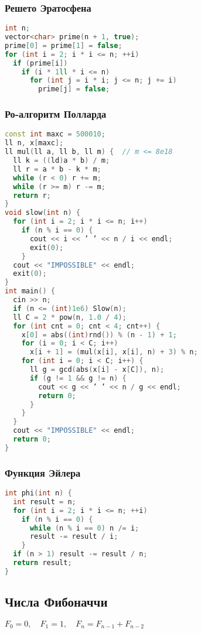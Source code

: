 \documentclass[10pt,a4paper,landscape,twosided]{extarticle}
\begin{document}
\begin{multicols}{3}
\subsubsection{Решето Эратосфена}
\begin{lstlisting}[language=C++]
int n;
vector<char> prime(n + 1, true);
prime[0] = prime[1] = false;
for (int i = 2; i * i <= n; ++i)
  if (prime[i])
    if (i * 1ll * i <= n)
      for (int j = i * i; j <= n; j += i)
        prime[j] = false;
\end{lstlisting}

\subsubsection{Ро-алгоритм Полларда}
\begin{lstlisting}[language=C++]
const int maxc = 500010;
ll n, x[maxc];
ll mul(ll a, ll b, ll m) {  // m <= 8e18
  ll k = ((ld)a * b) / m;
  ll r = a * b - k * m;
  while (r < 0) r += m;
  while (r >= m) r -= m;
  return r;
}
void slow(int n) {
  for (int i = 2; i * i <= n; i++)
    if (n % i == 0) {
      cout << i << ’ ’ << n / i << endl;
      exit(0);
    }
  cout << "IMPOSSIBLE" << endl;
  exit(0);
}
int main() {
  cin >> n;
  if (n <= (int)1e6) Slow(n);
  ll C = 2 * pow(n, 1.0 / 4);
  for (int cnt = 0; cnt < 4; cnt++) {
    x[0] = abs((int)rnd()) % (n - 1) + 1;
    for (i = 0; i < C; i++)
      x[i + 1] = (mul(x[i], x[i], n) + 3) % n;
    for (int i = 0; i < C; i++) {
      ll g = gcd(abs(x[i] - x[C]), n);
      if (g != 1 && g != n) {
        cout << g << ’ ’ << n / g << endl;
        return 0;
      }
    }
  }
  cout << "IMPOSSIBLE" << endl;
  return 0;
}\end{lstlisting}

\subsubsection{Функция Эйлера}
\begin{lstlisting}[language=C++]
int phi(int n) {
  int result = n;
  for (int i = 2; i * i <= n; ++i)
    if (n % i == 0) {
      while (n % i == 0) n /= i;
      result -= result / i;
    }
  if (n > 1) result -= result / n;
  return result;
}
\end{lstlisting}

\subsection{Числа Фибоначчи}
$F_0 = 0, \quad F_1 = 1, \quad F_n = F_{n-1} + F_{n-2}$


\end{multicols}
\end{document}
